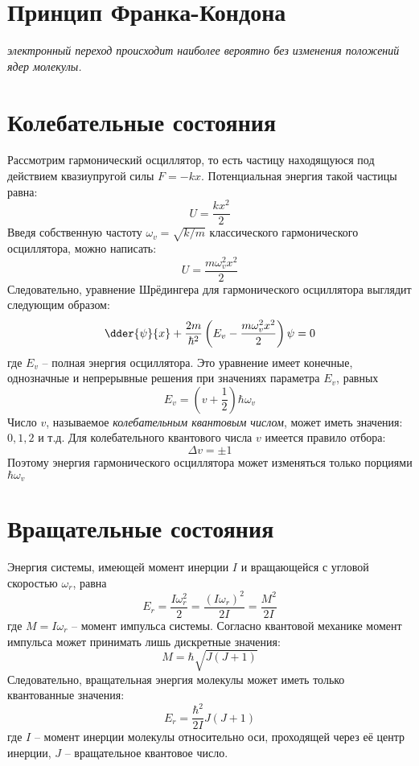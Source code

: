 \section{Принцип Франка-Кондона}
\emph{электронный переход происходит наиболее вероятно без 
изменения положений ядер молекулы.}

\section{Колебательные состояния}
Рассмотрим гармонический осциллятор, то есть частицу находящуюся под 
действием квазиупругой силы \( F = -kx \). Потенциальная энергия 
такой частицы равна:
\[ U = \frac{kx^2}{2} \]
Введя собственную частоту \( \omega_v = \sqrt{k/m} \) классического 
гармонического осциллятора, можно написать:
\[ U = \frac{m\omega^2_v x^2}{2} \]
Следовательно, уравнение Шрёдингера для гармонического осциллятора 
выглядит следующим образом:
\[ 
	\dder{\psi}{x} + \frac{2m}{\hbar^2}
	\left( E_v - \frac{m\omega^2_v x^2}{2}\right)\psi = 0
\]
где \( E_v \) -- полная энергия осциллятора. Это уравнение имеет 
конечные, однозначные и непрерывные решения при значениях параметра 
\( E_v \), равных
\[ E_v = \left(v + \frac{1}{2}\right)\hbar\omega_v \]
Число \( v \), называемое \emph{колебательным квантовым числом}, 
может иметь значения: \( 0, 1, 2 \) и т.д.
Для колебательного квантового числа \( v \) имеется правило отбора:
\[ \Delta v = \pm 1 \]
Поэтому энергия гармонического осциллятора может изменяться только 
порциями \( \hbar\omega_v \)

\section{Вращательные состояния}
Энергия системы, имеющей момент инерции \( I \) и вращающейся с 
угловой скоростью \( \omega_r \), равна 
\[ 
	E_r = \frac{I\omega^2_r}{2} = \frac{(I\omega_r)^2}{2I} = 
	\frac{M^2}{2I}
\]
где \( M = I\omega_r \) -- момент импульса системы. Согласно 
квантовой механике момент импульса может принимать лишь 
дискретные значения:
\[ M = \hbar\sqrt{J(J+1)} \]
Следовательно, вращательная энергия молекулы может иметь только 
квантованные значения:
\[ E_r = \frac{\hbar^2}{2I}J(J+1) \]
где \( I \) -- момент инерции молекулы относительно оси, проходящей 
через её центр инерции, \( J \) -- вращательное квантовое число.

\newpage
